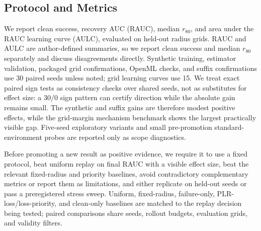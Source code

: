\documentclass[letterpaper]{article}
\begin{document}
\subsection{Protocol and Metrics}

We report clean success, recovery AUC (RAUC), median $r_{80}$, and area under the RAUC learning curve (AULC), evaluated on held-out radius grids. RAUC and AULC are author-defined summaries, so we report clean success and median $r_{80}$ separately and discuss disagreements directly. Synthetic training, estimator validation, packaged grid confirmations, OpenML checks, and suffix confirmations use 30 paired seeds unless noted; grid learning curves use 15. We treat exact paired sign tests as consistency checks over shared seeds, not as substitutes for effect size: a 30/0 sign pattern can certify direction while the absolute gain remains small. The synthetic and suffix gains are therefore modest positive effects, while the grid-margin mechanism benchmark shows the largest practically visible gap. Five-seed exploratory variants and small pre-promotion standard-environment probes are reported only as scope diagnostics.

Before promoting a new result as positive evidence, we require it to use a fixed protocol, beat uniform replay on final RAUC with a visible effect size, beat the relevant fixed-radius and priority baselines, avoid contradictory complementary metrics or report them as limitations, and either replicate on held-out seeds or pass a preregistered stress sweep. Uniform, fixed-radius, failure-only, PLR-loss/loss-priority, and clean-only baselines are matched to the replay decision being tested; paired comparisons share seeds, rollout budgets, evaluation grids, and validity filters.

\begin{table}[t]
\centering
\small
\resizebox{\textwidth}{!}{}
\caption{Thirty-seed result summary from artifact CSVs. OpenML rows are supervised margin-replay checks, so only RAUC applies; held-out replications for grid, OpenML, and suffix are reported in text. BGR is strongest in the procedural grid-margin and OpenML blood-transfusion checks. BGR-Suffix improves clean success, final object RAUC, transfer RAUC, and AULC, but uniform keeps the higher median critical radius.}
\label{tab:current-results}
\end{table}

\begin{table}[t]
\centering
\small
\resizebox{\textwidth}{!}{}
\caption{Selected paired effect sizes. Mean differences and 95\% confidence intervals are the primary quantities; W/L/T and exact sign-test $p$ values report paired-seed direction consistency. All listed comparisons use 30 paired seeds.}
\label{tab:significance}
\end{table}
\end{document}
